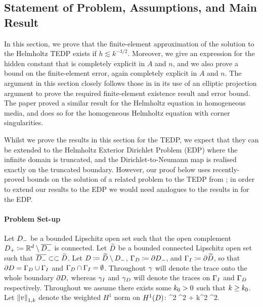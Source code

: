 \subsection{Statement of Problem, Assumptions, and Main Result}

In this section, we prove that the finite-element approximation of the solution to the Helmholtz TEDP exists if $ h \lesssim k^{-3/2}.$ Moreover, we give an expression for the hidden constant that is completely explicit in $A$ and $n$, and we also prove a bound on the finite-element error, again completely explicit in $A$ and $n$. The argument in this section closely follows those in \cite{FeWu:11,ChNi:18} in its use of an elliptic projection argument to prove the required finite-element existence result and error bound. The paper \cite{FeWu:11} proved a similar result for the Helmholtz equation in homogeneous media, and \cite{ChNi:18} does so for the homogeneous Helmholtz equation with corner singularities.

Whilst we prove the results in this section for the TEDP, we expect that they can be extended to the Helmholtz Exterior Dirichlet Problem (EDP) where the infinite domain is truncated, and the Dirichlet-to-Neumann map is realised exactly on the truncated boundary. However, our proof below uses recently-proved bounds on the solution of a related problem to the TEDP from \cite{ChNiTo:18}; in order to extend our results to the EDP we would need analogues to the results in \cite{ChNiTo:18} for the EDP.

\paragraph{Problem Set-up} Let $D_{-}$ be a bounded Lipschitz open set such that the open complement $D_{+}\coloneqq \mathbb R^{d}\setminus \overline{D_{-}}$ is connected. Let $\widetilde{D}$ be a bounded connected Lipschitz open set such that $\overline{D_{-}} \subset\subset\widetilde{D}$. 
Let $D\coloneqq\widetilde{D}\setminus D_{-}$, $\Gamma_{D}\coloneqq \partial D_{-}$, and $\Gamma_{I} \coloneqq\partial \widetilde{D}$, so that $\partial D= \Gamma_{D} \cup \Gamma_{I}$ and $\Gamma_{D}\cap \Gamma_{I} = \emptyset$. Throughout $\gamma$ will denote the trace onto the whole boundary $\partial D,$ whereas $\gamma_{I}$ and $\gamma_{D}$ will denote the traces on $\Gamma_{I}$ and $\Gamma_{D}$ respectively. Throughout we assume there exists some $k_0 > 0$ such that $k \geq k_0$. Let $\NW{v}$ denote the weighted $H^1$ norm on $\HoD$:
\beqs
{}^2 \de {}^2 + k^2 ^2.
\eeqs


